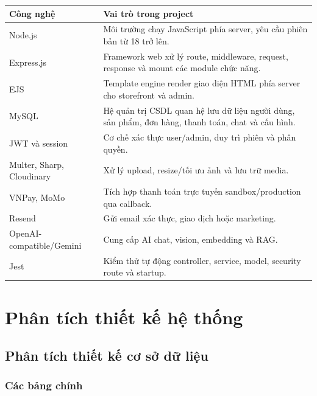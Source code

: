 \documentclass[12pt,a4paper]{report}
\begin{document}
\begin{longtable}{|p{4cm}|p{10.8cm}|}
\hline
\textbf{Công nghệ} & \textbf{Vai trò trong project} \\
\hline
Node.js & Môi trường chạy JavaScript phía server, yêu cầu phiên bản từ 18 trở lên. \\
\hline
Express.js & Framework web xử lý route, middleware, request, response và mount các module chức năng. \\
\hline
EJS & Template engine render giao diện HTML phía server cho storefront và admin. \\
\hline
MySQL & Hệ quản trị CSDL quan hệ lưu dữ liệu người dùng, sản phẩm, đơn hàng, thanh toán, chat và cấu hình. \\
\hline
JWT và session & Cơ chế xác thực user/admin, duy trì phiên và phân quyền. \\
\hline
Multer, Sharp, Cloudinary & Xử lý upload, resize/tối ưu ảnh và lưu trữ media. \\
\hline
VNPay, MoMo & Tích hợp thanh toán trực tuyến sandbox/production qua callback. \\
\hline
Resend & Gửi email xác thực, giao dịch hoặc marketing. \\
\hline
OpenAI-compatible/Gemini & Cung cấp AI chat, vision, embedding và RAG. \\
\hline
Jest & Kiểm thử tự động controller, service, model, security route và startup. \\
\hline
\end{longtable}

\chapter{Phân tích thiết kế hệ thống}

\section{Phân tích thiết kế cơ sở dữ liệu}

\subsection{Các bảng chính}
\end{document}
